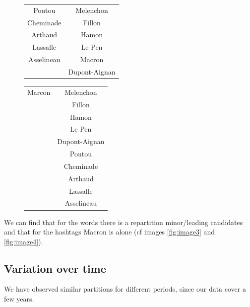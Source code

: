\documentclass[a4paper]{article}
\theoremstyle{definition}
\begin{document}
\begin{figure}
\begin{center}
\begin{multicols}{2}
\begin{tabular}{ | c | c |}
\hline
Poutou & Melenchon\\
Cheminade & Fillon\\
Arthaud & Hamon\\
Lassalle & Le Pen\\
Asselineau & Macron\\
& Dupont-Aignan\\
\hline
\end{tabular}
\bigskip

\begin{tabular}{ | c | c |}
\hline
Marcon & Melenchon\\
& Fillon\\
& Hamon\\
& Le Pen\\
& Dupont-Aignan\\
& Poutou\\
& Cheminade\\
& Arthaud \\
& Lassalle \\
& Asselineau \\
\hline
\end{tabular}
\bigskip
{}
\end{multicols}
\end{center}
\end{figure}

We can find that for the words there is a repartition minor/leading candidates and that for the hashtags Macron is alone (cf images \ref{fig:image3} and \ref{fig:image4}).

\subsection{Variation over time}
We have observed similar partitions for different periods, since our data cover a few years.
\end{document}
